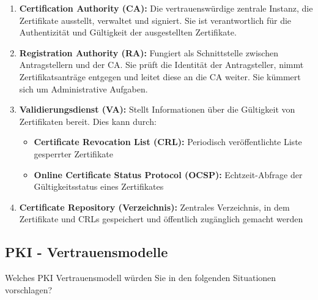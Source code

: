 \documentclass[a4paper]{article}
\begin{document}
\begin{enumerate}
    \begin{enumerate}
        \item \textbf{Certification Authority (CA):} Die vertrauenswürdige zentrale Instanz, die Zertifikate ausstellt, verwaltet und signiert. Sie ist verantwortlich für die Authentizität und Gültigkeit der ausgestellten Zertifikate.
        
        \item \textbf{Registration Authority (RA):} Fungiert als Schnittstelle zwischen Antragstellern und der CA. Sie prüft die Identität der Antragsteller, nimmt Zertifikatsanträge entgegen und leitet diese an die CA weiter. Sie kümmert sich um Administrative Aufgaben.
        
        \item \textbf{Validierungsdienst (VA):} Stellt Informationen über die Gültigkeit von Zertifikaten bereit. Dies kann durch:
        \begin{itemize}
            \item \textbf{Certificate Revocation List (CRL):} Periodisch veröffentlichte Liste gesperrter Zertifikate
            \item \textbf{Online Certificate Status Protocol (OCSP):} Echtzeit-Abfrage der Gültigkeitsstatus eines Zertifikates
        \end{itemize}
        
        \item \textbf{Certificate Repository (Verzeichnis):} Zentrales Verzeichnis, in dem Zertifikate und CRLs gespeichert und öffentlich zugänglich gemacht werden
    \end{enumerate}
\end{enumerate}

\subsection{PKI - Vertrauensmodelle}

Welches PKI Vertrauensmodell würden Sie in den folgenden Situationen vorschlagen?
\end{document}
